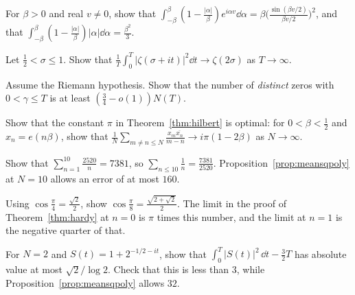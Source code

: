 \begin{exercise}[$\star$]\label{ex:fejervalue}
For $\beta>0$ and real $v\ne0$, show that $\int_{-\beta}^\beta(1-\frac{|\alpha|}\beta)e^{i\alpha v}\dd\alpha=\beta\bigl(\frac{\sin(\beta v/2)}{\beta v/2}\bigr)^2$, and that $\int_{-\beta}^\beta(1-\frac{|\alpha|}\beta)|\alpha|\dd\alpha=\frac{\beta^2}3$.
\end{exercise}

\begin{exercise}[$\star\star$]\label{ex:meansqsigma}
Let $\frac12<\sigma\le1$. Show that $\frac1T\int_0^T|\zeta(\sigma+it)|^2\dd t\to\zeta(2\sigma)$ as $T\to\infty$.
\end{exercise}

\begin{exercise}[$\star\star$]\label{ex:distinctzeros}
Assume the Riemann hypothesis. Show that the number of \emph{distinct} zeros with $0<\gamma\le T$ is at least $(\frac34-o(1))N(T)$.
\end{exercise}

\begin{exercise}[$\star\star\star$]\label{ex:hilbertopt}
Show that the constant $\pi$ in Theorem~\ref{thm:hilbert} is optimal: for $0<\beta<\frac12$ and $x_n=e(n\beta)$, show that $\frac1N\sum_{m\ne n\le N}\frac{x_m\overline{x_n}}{m-n}\to i\pi(1-2\beta)$ as $N\to\infty$.
\end{exercise}

\begin{exercise}[$\star$]\label{ex:v14-extra-14-1}
Show that $\sum_{n=1}^{10}\frac{2520}n=7381$, so $\sum_{n\le10}\frac1n=\frac{7381}{2520}$. Proposition~\ref{prop:meansqpoly} at $N=10$ allows an error of at most $160$.
\end{exercise}

\begin{exercise}[$\star$]\label{ex:v14-extra-14-2}
Using $\cos\frac\pi4=\frac{\sqrt2}2$, show $\cos\frac\pi8=\frac{\sqrt{2+\sqrt2}}2$. The limit in the proof of Theorem~\ref{thm:hardy} at $n=0$ is $\pi$ times this number, and the limit at $n=1$ is the negative quarter of that.
\end{exercise}

\begin{exercise}[$\star\star$]\label{ex:v14-extra-14-3}
For $N=2$ and $S(t)=1+2^{-1/2-it}$, show that $\int_0^T|S(t)|^2\,\dd t-\frac32 T$ has absolute value at most $\sqrt2/\log2$. Check that this is less than $3$, while Proposition~\ref{prop:meansqpoly} allows $32$.
\end{exercise}

